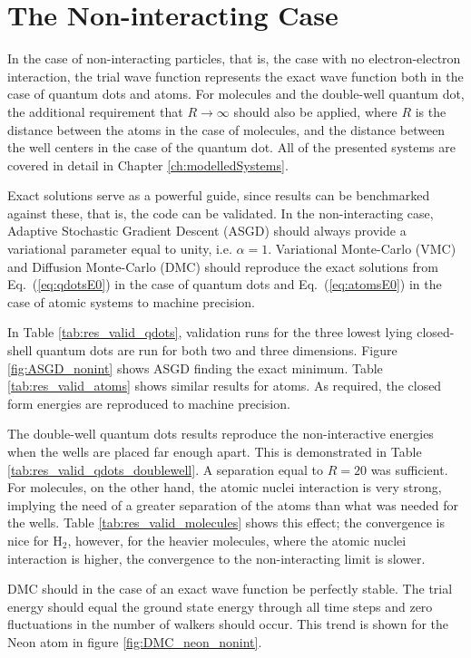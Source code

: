 \section{The Non-interacting Case}

In the case of non-interacting particles, that is, the case with no electron-electron interaction, the trial wave function represents the exact wave function both in the case of quantum dots and atoms. For molecules and the double-well quantum dot, the additional requirement that $R\to\infty$ should also be applied, where $R$ is the distance between the atoms in the case of molecules, and the distance between the well centers in the case of the quantum dot. All of the presented systems are covered in detail in Chapter \ref{ch:modelledSystems}.

Exact solutions serve as a powerful guide, since results can be benchmarked against these, that is, the code can be validated. In the non-interacting case, Adaptive Stochastic Gradient Descent (ASGD) should always provide a variational parameter equal to unity, i.e. $\alpha=1$. Variational Monte-Carlo (VMC) and Diffusion Monte-Carlo (DMC) should reproduce the exact solutions from Eq.~(\ref{eq:qdotsE0}) in the case of quantum dots and Eq.~(\ref{eq:atomsE0}) in the case of atomic systems to machine precision. 

In Table \ref{tab:res_valid_qdots}, validation runs for the three lowest lying closed-shell quantum dots are run for both two and three dimensions. Figure \ref{fig:ASGD_nonint} shows ASGD finding the exact minimum. Table \ref{tab:res_valid_atoms} shows similar results for atoms. As required, the closed form energies are reproduced to machine precision.

The double-well quantum dots results reproduce the non-interactive energies when the wells are placed far enough apart. This is demonstrated in Table \ref{tab:res_valid_qdots_doublewell}. A separation equal to $R = 20$ was sufficient. For molecules, on the other hand, the atomic nuclei interaction is very strong, implying the need of a greater separation of the atoms than what was needed for the wells. Table \ref{tab:res_valid_molecules} shows this effect; the convergence is nice for $\mathrm{H_2}$, however, for the heavier molecules, where the atomic nuclei interaction is higher, the convergence to the non-interacting limit is slower.

DMC should in the case of an exact wave function be perfectly stable. The trial energy should equal the ground state energy through all time steps and zero fluctuations in the number of walkers should occur. This trend is shown for the Neon atom in figure \ref{fig:DMC_neon_nonint}.

